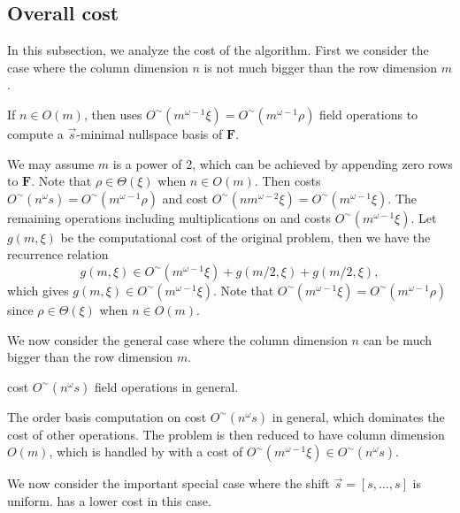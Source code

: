 \subsection{Overall cost}

In this subsection, we analyze the cost of the algorithm. First we
consider the case where the column dimension $n$ is not much bigger
than the row dimension $m$. 
\begin{lem}
\label{lem:costLowColDimension}If $n\in O\left(m\right)$, then 
uses $O^{\sim}\left(m^{\omega-1}\xi\right)=O^{\sim}\left(m^{\omega-1}\rho\right)$
field operations to compute a $\vec{s}$-minimal nullspace basis of
$\mathbf{F}$.\end{lem}
\begin{pf}
We may assume $m$ is a power of 2, which can be achieved by appending
zero rows to $\mathbf{F}$. Note that $\rho\in\Theta\left(\xi\right)$
when $n\in O\left(m\right)$. Then  costs
$O^{\sim}\left(n^{\omega}s\right)=O^{\sim}\left(m^{\omega-1}\rho\right)$
and  cost $O^{\sim}\left(nm^{\omega-2}\xi\right)=O^{\sim}\left(m^{\omega-1}\xi\right)$.
The remaining operations including multiplications on 
and  costs $O^{\sim}\left(m^{\omega-1}\xi\right)$.
Let $g(m,\xi)$ be the computational cost of the original problem,
then we have the recurrence relation 
\[
g(m,\xi)\in O^{\sim}(m^{\omega-1}\xi)+g(m/2,\xi)+g(m/2,\xi),
\]
 which gives $g(m,\xi)\in O^{\sim}(m^{\omega-1}\xi)$. Note that $O^{\sim}\left(m^{\omega-1}\xi\right)=O^{\sim}\left(m^{\omega-1}\rho\right)$
since $\rho\in\Theta\left(\xi\right)$ when $n\in O\left(m\right)$.
\end{pf}
We now consider the general case where the column dimension $n$ can
be much bigger than the row dimension $m$.
\begin{lem}
\label{lem:costGeneral} cost
$O^{\sim}\left(n^{\omega}s\right)$ field operations in general.\end{lem}
\begin{pf}
The order basis computation on  cost $O^{\sim}\left(n^{\omega}s\right)$
in general, which dominates the cost of other operations. The problem
is then reduced to have column dimension $O\left(m\right)$, which
is handled by  with a cost of
$O^{\sim}\left(m^{\omega-1}\xi\right)\in O^{\sim}\left(n^{\omega}s\right)$.
\end{pf}
We now consider the important special case where the shift $\vec{s}=\left[s,\dots,s\right]$
is uniform.  has a lower cost
in this case.

